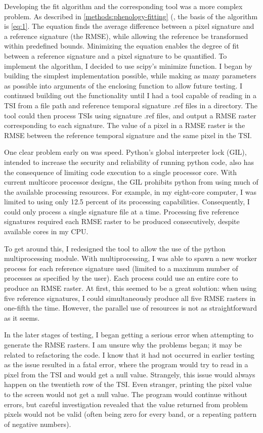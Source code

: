 Developing the fit algorithm and the corresponding tool was a more complex problem. As described in \autoref{methods:phenology-fitting} (, the basis of the algorithm is \autoref{eq:1}. The equation finds the average difference between a pixel signature and a reference signature (the RMSE), while allowing the reference be transformed within predefined bounds. Minimizing the equation enables the degree of fit between a reference signature and a pixel signature to be quantified. To implement the algorithm, I decided to use scipy’s minimize function. I began by building the simplest implementation possible, while making as many parameters as possible into arguments of the enclosing function to allow future testing. I continued building out the functionality until I had a tool capable of reading in a TSI from a file path and reference temporal signature .ref files in a directory. The tool could then process TSIs using signature .ref files, and output a RMSE raster corresponding to each signature. The value of a pixel in a RMSE raster is the RMSE between the reference temporal signature and the same pixel in the TSI.

One clear problem early on was speed. Python’s global interpreter lock (GIL), intended to increase the security and reliability of running python code, also has the consequence of limiting code execution to a single processor core. With current multicore processor designs, the GIL prohibits python from using much of the available processing resources. For example, in my eight-core computer, I was limited to using only 12.5 percent of its processing capabilities. Consequently, I could only process a single signature file at a time. Processing five reference signatures required each RMSE raster to be produced consecutively, despite available cores in my CPU.

To get around this, I redesigned the tool to allow the use of the python multiprocessing module. With multiprocessing, I was able to spawn a new worker process for each reference signature used (limited to a maximum number of processes as specified by the user). Each process could use an entire core to produce an RMSE raster. At first, this seemed to be a great solution: when using five reference signatures, I could simultaneously produce all five RMSE rasters in one-fifth the time. However, the parallel use of resources is not as straightforward as it seems.

In the later stages of testing, I began getting a serious error when attempting to generate the RMSE rasters. I am unsure why the problems began; it may be related to refactoring the code. I know that it had not occurred in earlier testing as the issue resulted in a fatal error, where the program would try to read in a pixel from the TSI and would get a null value. Strangely, this issue would always happen on the twentieth row of the TSI. Even stranger, printing the pixel value to the screen would not get a null value. The program would continue without errors, but careful investigation revealed that the value returned from problem pixels would not be valid (often being zero for every band, or a repeating pattern of negative numbers).

